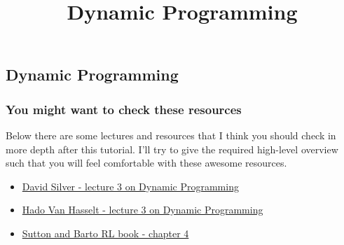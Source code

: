 

\subsection{Dynamic Programming} \title{Dynamic Programming} \author{} \date{}
\begin{frame}[plain,c]
    \titlepage
\end{frame}

\begin{frame}
    \frametitle{You might want to check these resources}
    Below there are some lectures and resources that I think you should check
    in more depth after this tutorial. I'll try to give the required high-level
    overview such that you will feel comfortable with these awesome resources.
    \begin{itemize}
        \item \href{https://youtu.be/Nd1-UUMVfz4}{David Silver - lecture 3 on Dynamic Programming}
        \item \href{https://youtu.be/hMbxmRyDw5M}{Hado Van Hasselt - lecture 3 on Dynamic Programming}
        \item \href{http://incompleteideas.net/book/RLbook2018.pdf}{Sutton and Barto RL book - chapter 4}
    \end{itemize}
\end{frame}

